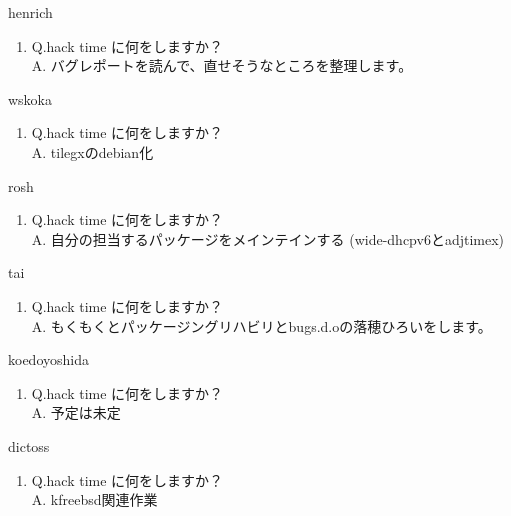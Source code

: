 \begin{prework}{ henrich }
  \begin{enumerate}
  \item Q.hack time に何をしますか？\\
    A. バグレポートを読んで、直せそうなところを整理します。
  \end{enumerate}
\end{prework}

\begin{prework}{ wskoka }
  \begin{enumerate}
  \item Q.hack time に何をしますか？\\
    A. tilegxのdebian化
  \end{enumerate}
\end{prework}

\begin{prework}{ rosh }
  \begin{enumerate}
  \item Q.hack time に何をしますか？\\
    A. 自分の担当するパッケージをメインテインする (wide-dhcpv6とadjtimex)
  \end{enumerate}
\end{prework}

\begin{prework}{ tai }
  \begin{enumerate}
  \item Q.hack time に何をしますか？\\
    A. もくもくとパッケージングリハビリとbugs.d.oの落穂ひろいをします。
  \end{enumerate}
\end{prework}

\begin{prework}{ koedoyoshida }
  \begin{enumerate}
  \item Q.hack time に何をしますか？\\
    A. 予定は未定
  \end{enumerate}
\end{prework}

\begin{prework}{ dictoss }
  \begin{enumerate}
  \item Q.hack time に何をしますか？\\
    A. kfreebsd関連作業
  \end{enumerate}
\end{prework}

